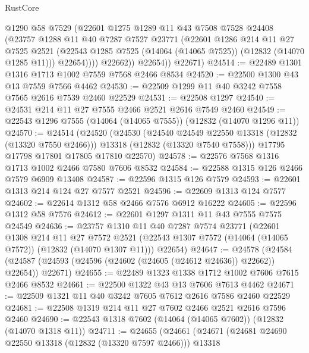 \begin{lexlean}{RustCore}
\begin{coremodule}
                @1290
                @58
                @7529
                (@22601
                  @1275
                  @1289
                  @11
                  @43
                  @7508
                  @7528
                  @24408
                  (@23757
                    @1288
                    @11
                    @40
                    @7287
                    @7527
                    @23771
                    (@22601
                      @1286
                      @214
                      @11
                      @27
                      @7525
                      @2521
                      (@22543 @1285 @7525 (@14064 (@14065 @7525)) (@12832 (@14070 @1285 @11)))
                      @22654))))
              @22662))
          @22654))
      @22671)
@24514 := @22489 @1301 @1316 @1713 @1002 @7559 @7568 @2466 @8534
@24520 := @22500 @1300 @43 @13 @7559 @7566 @4462
@24530 := @22509 @1299 @11 @40 @3242 @7558 @7565 @2616 @7539 @2460 @22529
@24531 := @22508 @1297
@24540 := @24531 @214 @11 @27 @7555 @2466 @2521 @2616 @7549 @2460
@24549 := @22543 @1296 @7555 (@14064 (@14065 @7555)) (@12832 (@14070 @1296 @11))
@24570 := @24514
    (@24520
      (@24530
        (@24540 @24549 @22550 @13318 (@12832 (@13320 @7550 @2466)))
        @13318
        (@12832 (@13320 @7540 @7558)))
      @17795
      @17798
      @17801
      @17805
      @17810
      @22570)
@24578 := @22576 @7568 @1316 @1713 @1002 @2466 @7580 @7606 @8532
@24584 := @22588 @1315 @126 @2466 @7579 @6909 @13408
@24587 := @22596 @1315 @126 @7579
@24593 := @22601 @1313 @214 @124 @27 @7577 @2521
@24596 := @22609 @1313 @124 @7577
@24602 := @22614 @1312 @58 @2466 @7576 @6912 @16222
@24605 := @22596 @1312 @58 @7576
@24612 := @22601 @1297 @1311 @11 @43 @7555 @7575 @24549
@24636 := @23757
    @1310
    @11
    @40
    @7287
    @7574
    @23771
    (@22601
      @1308
      @214
      @11
      @27
      @7572
      @2521
      (@22543 @1307 @7572 (@14064 (@14065 @7572)) (@12832 (@14070 @1307 @11)))
      @22654)
@24647 := @24578
    (@24584 (@24587 (@24593 (@24596 (@24602 (@24605 (@24612 @24636)) @22662)) @22654)) @22671)
@24655 := @22489 @1323 @1338 @1712 @1002 @7606 @7615 @2466 @8532
@24661 := @22500 @1322 @43 @13 @7606 @7613 @4462
@24671 := @22509 @1321 @11 @40 @3242 @7605 @7612 @2616 @7586 @2460 @22529
@24681 := @22508 @1319 @214 @11 @27 @7602 @2466 @2521 @2616 @7596 @2460
@24690 := @22543 @1318 @7602 (@14064 (@14065 @7602)) (@12832 (@14070 @1318 @11))
@24711 := @24655
    (@24661
      (@24671
        (@24681 @24690 @22550 @13318 (@12832 (@13320 @7597 @2466)))
        @13318

\end{coremodule}
\end{lexlean}
